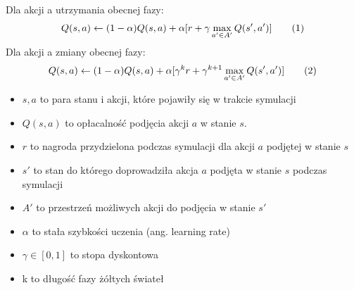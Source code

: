 \documentclass[12pt]{book}
\theoremstyle{plain}
\newcommand\addtag{\refstepcounter{equation}
\renewcommand{\labelenumii}{\theenumii}
\renewcommand{\theenumii}{\theenumi.\arabic{enumii}.}
\tag{\theequation}}
\begin{document}
Dla akcji a utrzymania obecnej fazy:
\[Q(s,a) \leftarrow (1-\alpha)Q(s,a) + \alpha [r + \gamma \max_{a' \in A'} Q(s',a')] \addtag \label{eq:Q_DQN} \]
Dla akcji a zmiany obecnej fazy:
\[Q(s,a) \leftarrow  (1-\alpha)Q(s,a) + \alpha [\gamma^{k} r + \gamma^{k+1} \max_{a' \in A'} Q(s',a')] \addtag \label{eq:Q_DQN_II} \]
\begin{itemize}
	\item $ s,a $ to para stanu i akcji, które pojawiły się w trakcie symulacji
	\item $Q(s,a)$ to opłacalność podjęcia akcji $a$ w stanie $s$.
	\item $ r $ to nagroda przydzielona podczas symulacji dla akcji $ a $ podjętej w stanie $ s $
	\item $ s' $ to stan do którego doprowadziła akcja $ a $ podjęta w stanie $ s $ podczas symulacji
	\item $ A' $ to przestrzeń możliwych akcji do podjęcia w stanie $ s' $
	\item $\alpha$ to stała szybkości uczenia (ang. learning rate)
	\item $\gamma \in [0,1]$  to stopa dyskontowa
	\item k to długość fazy żółtych świateł
\end{itemize}









\end{document}

